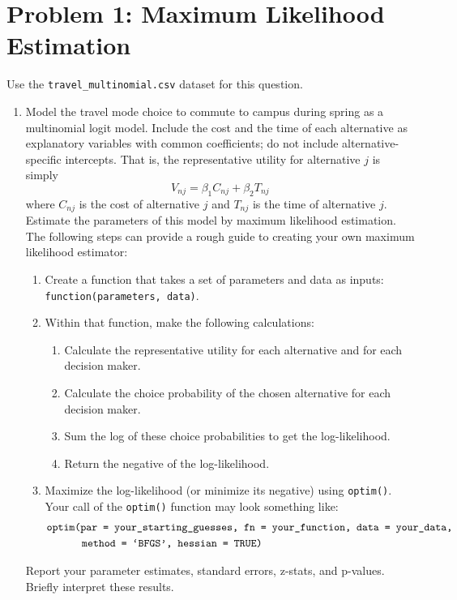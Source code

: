 \documentclass[11pt,letterpaper]{article}
\begin{document}
\section*{Problem 1: Maximum Likelihood Estimation}

Use the \texttt{travel\_multinomial.csv} dataset for this question.

\begin{enumerate}[label=\alph*., leftmargin=*]
	\item Model the travel mode choice to commute to campus during spring as a multinomial logit model. Include the cost and the time of each alternative as explanatory variables with common coefficients; do not include alternative-specific intercepts. That is, the representative utility for alternative $j$ is simply
	$$V_{nj} = \beta_1 C_{nj} + \beta_2 T_{nj}$$
	where $C_{nj}$ is the cost of alternative $j$ and $T_{nj}$ is the time of alternative $j$. Estimate the parameters of this model by maximum likelihood estimation. The following steps can provide a rough guide to creating your own maximum likelihood estimator:
	\begin{enumerate}[label=\Roman*.]
		\item Create a function that takes a set of parameters and data as inputs: \texttt{function(parameters, data)}.
		\item Within that function, make the following calculations:
		\begin{enumerate}[label=\roman*.]
			\item Calculate the representative utility for each alternative and for each decision maker.
			\item Calculate the choice probability of the chosen alternative for each decision maker.
			\item Sum the log of these choice probabilities to get the log-likelihood.
			\item Return the negative of the log-likelihood.
		\end{enumerate}
		\item Maximize the log-likelihood (or minimize its negative) using \texttt{optim()}. Your call of the \texttt{optim()} function may look something like:
		\begin{align*}
			&\text{\texttt{optim(par = your\_starting\_guesses, fn = your\_function, data = your\_data,}} \\
			& \qquad \quad \; \text{\texttt{method = `BFGS', hessian = TRUE)}}
		\end{align*}
	\end{enumerate}
	Report your parameter estimates, standard errors, z-stats, and p-values. Briefly interpret these results.


\end{enumerate}
\end{document}

